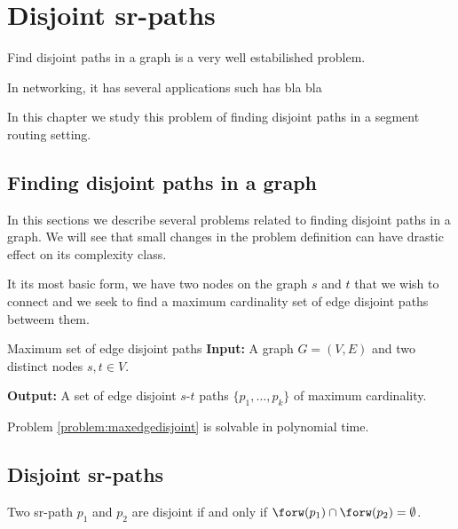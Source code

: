 \chapter{Disjoint sr-paths}

Find disjoint paths in a graph is a very well estabilished problem.

In networking, it has several applications such has bla bla

In this chapter we study this problem of finding disjoint paths in a segment routing
setting. 

\section{Finding disjoint paths in a graph}

In this sections we describe several problems related to finding disjoint paths in a graph.
We will see that small changes in the problem definition can have drastic effect on its 
complexity class.

It its most basic form, we have two nodes on the graph $s$ and $t$ that we wish to connect
and we seek to find a maximum cardinality set of edge disjoint paths betweem them.

\begin{problem}{Maximum set of edge disjoint paths}
\label{problem:maxedgedisjoint}
\textbf{Input:} A graph $G = (V, E)$ and two distinct nodes $s, t \in V$.

\textbf{Output:} A set of edge disjoint $s$-$t$ paths $\{ p_1, \ldots, p_k\}$ of maximum cardinality.
\end{problem}

Problem \ref{problem:maxedgedisjoint} is solvable in polynomial time.


\section{Disjoint sr-paths}



\begin{definition}
Two sr-path $p_1$ and $p_2$ are disjoint if and only if $\forw(p_1) \cap \forw(p_2) = \emptyset$.
\end{definition}

